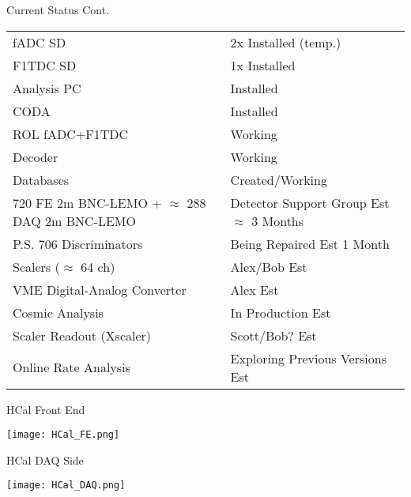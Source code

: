 \documentclass[10pt]{beamer}
\begin{document}
\begin{frame}{Current Status Cont.}

	\begin{table}[t]
	\centering
	\begin{tabular}{|ll|}
	\hline
	\makecell{Item} & \makecell{Status}\\
	\hline
	fADC SD & 2x Installed (temp.) \\
	F1TDC SD & 1x Installed \\
	Analysis PC & Installed \\
	CODA & Installed \\
	ROL fADC+F1TDC & Working \\
	Decoder & Working \\
	Databases & Created/Working \\
	\hline
	\makecell{720 FE 2m BNC-LEMO + \\ $\approx$ 288 DAQ 2m BNC-LEMO} & \makecell{Detector Support Group \\ Est $\approx$ 3 Months}\\
	P.S. 706 Discriminators & Being Repaired Est 1 Month \\
	Scalers ($\approx$ 64 ch) & Alex/Bob Est  \\
	VME Digital-Analog Converter & Alex Est \\
	Cosmic Analysis & In Production Est \\
	Scaler Readout (Xscaler) & Scott/Bob? Est \\
	Online Rate Analysis & Exploring Previous Versions Est \\
	\hline
	\end{tabular}
	\label{tab:status}
	\end{table}
	
\end{frame}

\begin{frame}{HCal Front End}

	\texttt{[image: HCal\_FE.png]}

\end{frame}

\begin{frame}{HCal DAQ Side}

	\texttt{[image: HCal\_DAQ.png]}

\end{frame}
\end{document}
